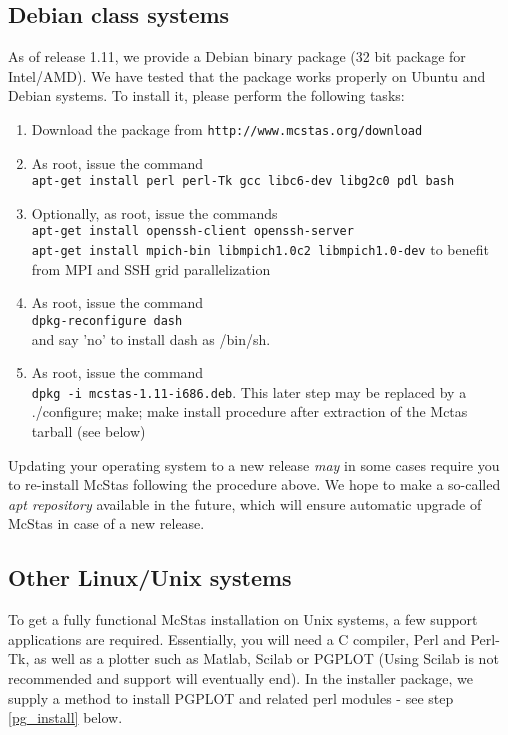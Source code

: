 \subsection{Debian class systems}
\label{ss:deb_install}
As of release 1.11, we provide a Debian binary package (32 bit package for Intel/AMD). We have tested that the
package works properly on Ubuntu and Debian systems. To install it, please
perform the following tasks:
\begin{enumerate}
\item{Download the package from \verb+http://www.mcstas.org/download+}
\item{As root, issue the command \\\verb+apt-get install perl perl-Tk gcc libc6-dev libg2c0 pdl bash+}
\item{Optionally, as root, issue the commands
\\\verb+apt-get install openssh-client openssh-server+
\\\verb+apt-get install mpich-bin libmpich1.0c2 libmpich1.0-dev+
to benefit from MPI and SSH grid parallelization}
\item{As root, issue the command \\\verb+dpkg-reconfigure dash+\\and
    say 'no' to install dash as /bin/sh.}
\item{As root, issue the command \\\verb+dpkg -i mcstas-1.11-i686.deb+. This later step may be replaced by a ./configure; make; make install procedure after extraction of the Mctas tarball (see below)}
\end{enumerate}
Updating your operating system to a new release \emph{may} in some cases require you to re-install McStas following the procedure above. We hope to make a so-called \emph{apt repository} available in the future, which will ensure automatic upgrade of McStas in case of a new release.

\subsection{Other Linux/Unix systems}
To get a fully functional McStas installation on Unix systems, a few support
applications are required. Essentially, you will need a C compiler,
Perl and Perl-Tk, as well as a plotter such as Matlab, Scilab or
PGPLOT (Using Scilab is not recommended and support will eventually
end). In the installer package, we supply a method to install PGPLOT
and related perl modules - see step \ref{pg_install} below.

